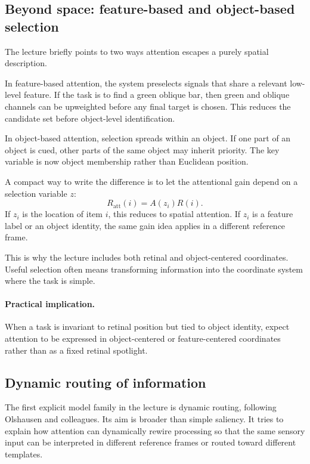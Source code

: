 \subsection{Beyond space: feature-based and object-based selection}

The lecture briefly points to two ways attention escapes a purely spatial description.

In feature-based attention, the system preselects signals that share a relevant low-level feature. If the task is to find a green oblique bar, then green and oblique channels can be upweighted before any final target is chosen. This reduces the candidate set before object-level identification.

In object-based attention, selection spreads within an object. If one part of an object is cued, other parts of the same object may inherit priority. The key variable is now object membership rather than Euclidean position.

A compact way to write the difference is to let the attentional gain depend on a selection variable \(z\):
\[
R_{\mathrm{att}}(i) = A(z_i)R(i).
\]
If \(z_i\) is the location of item \(i\), this reduces to spatial attention. If \(z_i\) is a feature label or an object identity, the same gain idea applies in a different reference frame.

This is why the lecture includes both retinal and object-centered coordinates. Useful selection often means transforming information into the coordinate system where the task is simple.

\paragraph{Practical implication.}
When a task is invariant to retinal position but tied to object identity, expect attention to be expressed in object-centered or feature-centered coordinates rather than as a fixed retinal spotlight.

\subsection{Dynamic routing of information}

The first explicit model family in the lecture is dynamic routing, following Olshausen and colleagues. Its aim is broader than simple saliency. It tries to explain how attention can dynamically rewire processing so that the same sensory input can be interpreted in different reference frames or routed toward different templates.

